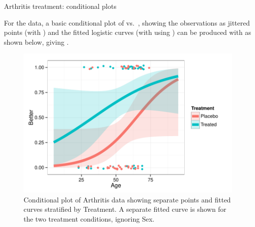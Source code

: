 \documentclass[11pt]{book}
\renewenvironment{knitrout}{\small\renewcommand{\baselinestretch}{.85}}{} %
\begin{document}
\begin{Example}{Arthritis treatment: conditional plots}

For the  data, a basic conditional plot of  vs.\ ,
showing the observations as jittered points (with )
and the fitted logistic curves (with  using )
can be produced with  as shown below, giving .
\begin{knitrout}
\color{fgcolor}\begin{kframe}
\begin{alltt}
 \hlkwb{<-}    \hlopt{+}
  \hlstd{(}\hlstd{,} \hlstd{)} \hlopt{+} \hlstd{()} \hlopt{+}
  \hlstd{(} \hlstd{=} \hlstd{(} \hlstd{=} \hlstd{,}  \hlstd{=} \hlstd{))} \hlopt{+}
  \hlstd{(} \hlstd{=} \hlstd{,}    \hlstd{=} \hlstd{,}
              \hlstd{(} \hlstd{=}\hlstd{,} \hlstd{=}\hlstd{)}
   
\end{alltt}
\end{kframe}\begin{figure}[!htbp]


\centerline{\includegraphics[width=.6\textwidth]{ch07/fig/arth-cond1} }

\caption[Conditional plot of Arthritis data showing separate points and fitted curves stratified by Treatment]{Conditional plot of Arthritis data showing separate points and fitted curves stratified by Treatment. A separate fitted curve is shown for the two treatment conditions, ignoring Sex.\label{fig:arth-cond1}}
\end{figure}



\end{knitrout}
\end{Example}
\end{document}
